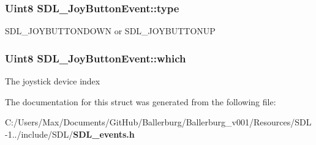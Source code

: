 \subsubsection[{type}]{\setlength{\rightskip}{0pt plus 5cm}Uint8 S\+D\+L\+\_\+\+Joy\+Button\+Event\+::type}\label{struct_s_d_l___joy_button_event_a1ec5304348dc281dac6b3b70825f115e}
S\+D\+L\+\_\+\+J\+O\+Y\+B\+U\+T\+T\+O\+N\+D\+O\+W\+N or S\+D\+L\+\_\+\+J\+O\+Y\+B\+U\+T\+T\+O\+N\+U\+P 
\subsubsection[{which}]{\setlength{\rightskip}{0pt plus 5cm}Uint8 S\+D\+L\+\_\+\+Joy\+Button\+Event\+::which}\label{struct_s_d_l___joy_button_event_a853258976673fceb8cd7340260b3823d}
The joystick device index 

The documentation for this struct was generated from the following file\+:\begin{DoxyCompactItemize}
\item 
C\+:/\+Users/\+Max/\+Documents/\+Git\+Hub/\+Ballerburg/\+Ballerburg\+\_\+v001/\+Resources/\+S\+D\+L-\/1../include/\+S\+D\+L/{\bf S\+D\+L\+\_\+events.\+h}\end{DoxyCompactItemize}
